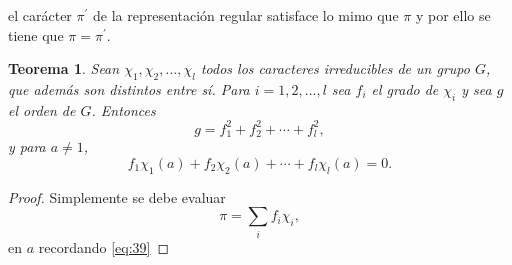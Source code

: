 \documentclass[12pt]{book}
\newtheorem{theorem}{Teorema}[section]
\theoremstyle{definition}
\newcounter{in}
\begin{document}
el carácter $\pi^{'}$ de la representación regular satisface lo mimo
que $\pi$ y por ello se tiene que $\pi = \pi^{'}$.
\begin{theorem}
  \label{t4_8}
  Sean $\chi_{1}, \chi_{2},...,\chi_{l} $ todos
  los caracteres irreducibles de un grupo $G$, que además son distintos
  entre sí. Para $i=1, 2,..., l$ sea $f_{i}$ el grado de $\chi_{i}$ y sea
  $g$ el orden de $G$. Entonces
  \begin{equation*}
    g=f_{1}^{2}+f_{2}^{2}+ \cdots + f_{l}^{2},
  \end{equation*}
  y para $a \neq 1$,
  \begin{equation*}
    f_{1} \chi_{1}(a)+f_{2} \chi_{2}(a)+ \cdots + f_{l} \chi_{l}(a) = 0.
  \end{equation*}
\end{theorem}
\begin{proof}
  Simplemente se debe evaluar
  \begin{equation}
    \label{eq:41}
    \pi=\sum_{i} f_{i} \chi_{i},
  \end{equation}
 en $a$ recordando \ref{eq:39}
\end{proof}
\end{document}

